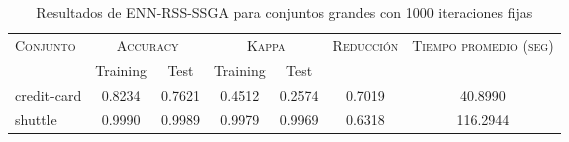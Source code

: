 \begin{table}[]
\centering
\begin{tabular}{l c c c c c c}
\hline
\multirow{2}{*}{\textsc{Conjunto}}
	& \multicolumn{2}{c}{\textsc{Accuracy}}
	& \multicolumn{2}{c}{\textsc{Kappa}}
	& \textsc{Reducción}
	& \textsc{Tiempo promedio (seg)} \\
	& Training & Test
	& Training & Test \\ 
\hline
\hline

credit-card & 0.8234 & 0.7621 & 0.4512 & 0.2574 & 0.7019 & 40.8990 \\
shuttle & 0.9990 & 0.9989 & 0.9979 & 0.9969 & 0.6318 & 116.2944  \\

\hline
\end{tabular}
\caption{Resultados de ENN-RSS-SSGA para conjuntos grandes con 1000 iteraciones fijas}
\label{res-grande-ENN-RSS-ssga}
\end{table}

\clearpage

